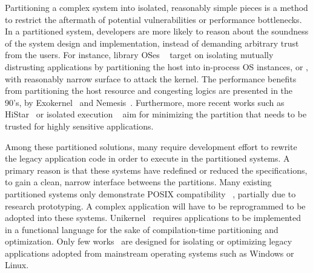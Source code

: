 Partitioning a complex system into
isolated, reasonably simple pieces
is a method
to restrict the aftermath of potential vulnerabilities or
performance bottlenecks.
In a partitioned system, developers are more likely to reason about
the soundness of the system design and implementation,
instead of demanding arbitrary trust from the users.
For instance, library OSes
~\citep{porter11drawbridge, baumann13bascule, unikernels}
target on isolating mutually distrusting applications
by partitioning the host into in-process OS instances,
or \emph{\picoprocs{}},
with reasonably narrow surface to attack the kernel.
The performance benefits
from partitioning the host resource and congesting logics
are presented in the 90's,
by Exokernel~\citep{engler95exokernel}
and Nemesis~\citep{leslie96nemesis}.
Furthermore, more recent works such as HiStar~\citep{zeldovich+histar}
or isolated execution
~\citep{flicker, trustzone, intelsgx, criswell2014virtualghost}
aim for minimizing the partition that needs to be trusted
for highly sensitive applications.



Among these partitioned solutions,
many require
development effort to rewrite the legacy application code
in order to execute in the partitioned systems.
A primary reason %
is that these systems
have redefined or reduced the specifications,
to gain a clean, narrow interface betweens the partitions.
Many existing partitioned systems only demonstrate POSIX compatibility
~\citep{engler95exokernel, leslie96nemesis, zeldovich+histar},
partially due to research prototyping.
A complex application
will have to be reprogrammed to be adopted into these systems.
Unikernel~\citep{unikernels} requires applications to be implemented
in a functional language for the sake of compilation-time
partitioning and optimization.
Only few works~\citep{porter11drawbridge, baumann13bascule, tsai14graphene}
are designed for isolating or optimizing
legacy applications adopted from mainstream operating systems such as Windows or Linux.


